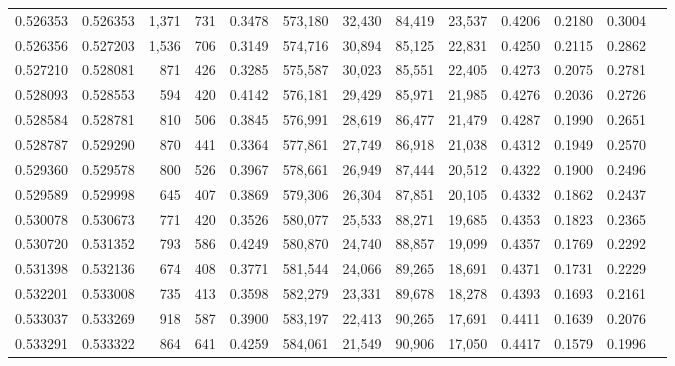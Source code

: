 \begin{tabular}{rrrrrrrrrrrrr}
0.526353 & 0.526353 &  1,371 &   731 &                                     0.3478 & 573,180 &  32,430 &  84,419 &  23,537 & 0.4206 & 0.2180 & 0.3004 \\
0.526356 & 0.527203 &  1,536 &   706 &                                     0.3149 & 574,716 &  30,894 &  85,125 &  22,831 & 0.4250 & 0.2115 & 0.2862 \\
0.527210 & 0.528081 &    871 &   426 &                                     0.3285 & 575,587 &  30,023 &  85,551 &  22,405 & 0.4273 & 0.2075 & 0.2781 \\
0.528093 & 0.528553 &    594 &   420 &                                     0.4142 & 576,181 &  29,429 &  85,971 &  21,985 & 0.4276 & 0.2036 & 0.2726 \\
0.528584 & 0.528781 &    810 &   506 &                                     0.3845 & 576,991 &  28,619 &  86,477 &  21,479 & 0.4287 & 0.1990 & 0.2651 \\
0.528787 & 0.529290 &    870 &   441 &                                     0.3364 & 577,861 &  27,749 &  86,918 &  21,038 & 0.4312 & 0.1949 & 0.2570 \\
0.529360 & 0.529578 &    800 &   526 &                                     0.3967 & 578,661 &  26,949 &  87,444 &  20,512 & 0.4322 & 0.1900 & 0.2496 \\
0.529589 & 0.529998 &    645 &   407 &                                     0.3869 & 579,306 &  26,304 &  87,851 &  20,105 & 0.4332 & 0.1862 & 0.2437 \\
0.530078 & 0.530673 &    771 &   420 &                                     0.3526 & 580,077 &  25,533 &  88,271 &  19,685 & 0.4353 & 0.1823 & 0.2365 \\
0.530720 & 0.531352 &    793 &   586 &                                     0.4249 & 580,870 &  24,740 &  88,857 &  19,099 & 0.4357 & 0.1769 & 0.2292 \\
0.531398 & 0.532136 &    674 &   408 &                                     0.3771 & 581,544 &  24,066 &  89,265 &  18,691 & 0.4371 & 0.1731 & 0.2229 \\
0.532201 & 0.533008 &    735 &   413 &                                     0.3598 & 582,279 &  23,331 &  89,678 &  18,278 & 0.4393 & 0.1693 & 0.2161 \\
0.533037 & 0.533269 &    918 &   587 &                                     0.3900 & 583,197 &  22,413 &  90,265 &  17,691 & 0.4411 & 0.1639 & 0.2076 \\
0.533291 & 0.533322 &    864 &   641 &                                     0.4259 & 584,061 &  21,549 &  90,906 &  17,050 & 0.4417 & 0.1579 & 0.1996 \\

\end{tabular}
